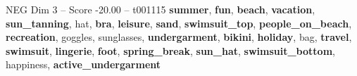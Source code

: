 \begin{textsample}{NEG Dim 3 – Score -20.00 – t001115}  \label{ex:f3_neg_016}
\textbf{summer}, \textbf{fun}, \textbf{beach}, \textbf{vacation}, \textbf{sun\_tanning}, hat, \textbf{bra}, \textbf{leisure}, \textbf{sand}, \textbf{swimsuit\_top}, \textbf{people\_on\_beach}, \textbf{recreation}, goggles, sunglasses, \textbf{undergarment}, \textbf{bikini}, \textbf{holiday}, bag, \textbf{travel}, \textbf{swimsuit}, \textbf{lingerie}, \textbf{foot}, \textbf{spring\_break}, \textbf{sun\_hat}, \textbf{swimsuit\_bottom}, happiness, \textbf{active\_undergarment}

\end{textsample}
